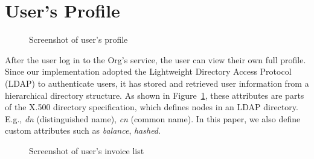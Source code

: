 \section{User's Profile}

\begin{figure}[htb]
    \centering
    \caption{{\footnotesize Screenshot of user's profile}}
    \label{fig:profile}
\end{figure}
After the user log in to the Org's service, the user can view their own full profile. Since our implementation adopted the Lightweight Directory Access Protocol (LDAP) to authenticate users, it has stored and retrieved user information from a hierarchical directory structure. As shown in Figure~\ref{fig:profile}, these attributes are parts of the X.500 directory specification, which defines nodes in an LDAP directory. E.g., \textit{dn} (distinguished name), \textit{cn} (common name). In this paper, we also define custom attributes such as \textit{balance}, \textit{hashed}.
\newpage

\begin{figure}[htb]
    \centering
    \caption{{\footnotesize Screenshot of user's invoice list}}
    \label{fig:invoicelist}
\end{figure}

